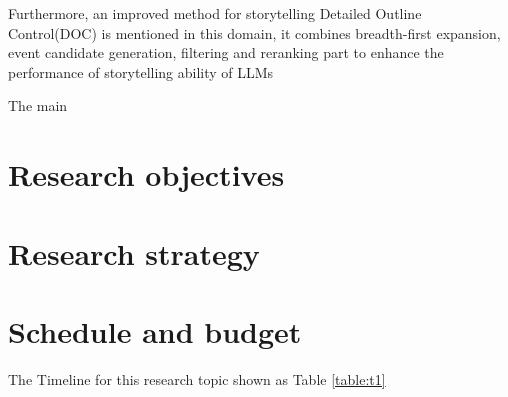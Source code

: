 \documentclass[10pt]{article}
\begin{document}
\begin{multicols}{2}
Furthermore, an improved method for storytelling Detailed Outline Control(DOC) is mentioned in this domain, it combines breadth-first expansion, event candidate generation, filtering and reranking part to enhance the performance of storytelling ability of LLMs\cite{yang-etal-2023-doc}

The main  

\section{Research objectives} 

	
\section{Research strategy}


\section{Schedule and budget}

The Timeline for this research topic shown as Table \ref{table:t1}


\end{multicols}
\end{document}
